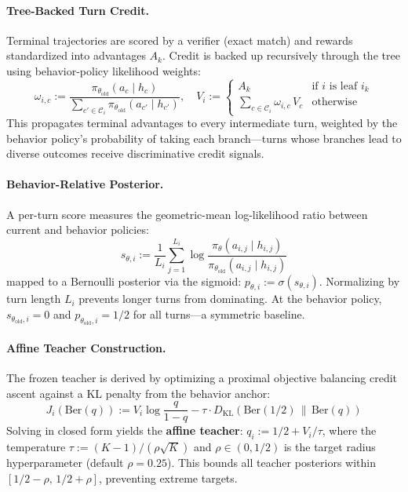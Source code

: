 \documentclass[11pt,a4paper]{article}
\begin{document}
\paragraph{Tree-Backed Turn Credit.}
Terminal trajectories are scored by a verifier (exact match) and rewards standardized into advantages $A_k$. Credit is backed up recursively through the tree using behavior-policy likelihood weights:
\begin{equation}
\omega_{i,c} := \frac{\pi_{\theta_{\text{old}}}(a_c \mid h_c)}{\sum_{c' \in \mathcal{C}_i} \pi_{\theta_{\text{old}}}(a_{c'} \mid h_{c'})}, \quad
V_i := \begin{cases} A_k & \text{if } i \text{ is leaf } i_k \\ \sum_{c \in \mathcal{C}_i} \omega_{i,c}\, V_c & \text{otherwise} \end{cases}
\end{equation}
This propagates terminal advantages to every intermediate turn, weighted by the behavior policy's probability of taking each branch---turns whose branches lead to diverse outcomes receive discriminative credit signals.

\paragraph{Behavior-Relative Posterior.}
A per-turn score measures the geometric-mean log-likelihood ratio between current and behavior policies:
\begin{equation}
s_{\theta,i} := \frac{1}{L_i} \sum_{j=1}^{L_i} \log \frac{\pi_\theta(a_{i,j} \mid h_{i,j})}{\pi_{\theta_{\text{old}}}(a_{i,j} \mid h_{i,j})}
\end{equation}
mapped to a Bernoulli posterior via the sigmoid: $p_{\theta,i} := \sigma(s_{\theta,i})$. Normalizing by turn length $L_i$ prevents longer turns from dominating. At the behavior policy, $s_{\theta_{\text{old}},i} = 0$ and $p_{\theta_{\text{old}},i} = 1/2$ for all turns---a symmetric baseline.

\paragraph{Affine Teacher Construction.}
The frozen teacher is derived by optimizing a proximal objective balancing credit ascent against a KL penalty from the behavior anchor:
\begin{equation}
J_i(\text{Ber}(q)) := V_i \log\frac{q}{1-q} - \tau \cdot D_{\text{KL}}(\text{Ber}(1/2) \,\|\, \text{Ber}(q))
\end{equation}
Solving in closed form yields the \textbf{affine teacher}: $q_i := 1/2 + V_i/\tau$, where the temperature $\tau := (K{-}1)/(\rho\sqrt{K})$ and $\rho \in (0, 1/2)$ is the target radius hyperparameter (default $\rho{=}0.25$). This bounds all teacher posteriors within $[1/2 - \rho,\, 1/2 + \rho]$, preventing extreme targets.
\end{document}
